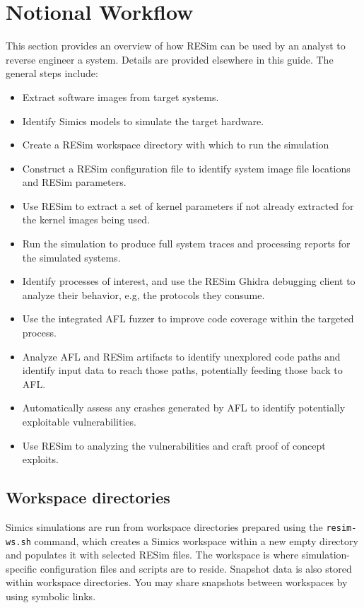 \documentclass[titlepage]{article}
\begin{document}
\section{Notional Workflow}
\label{workflow}
This section provides an overview of how RESim can be used by an analyst to reverse engineer a system. Details are provided elsewhere
in this guide.  The general steps include:
\begin{itemize}
\item Extract software images from target systems.
\item Identify Simics models to simulate the target hardware.
\item Create a RESim workspace directory with which to run the simulation
\item Construct a RESim configuration file to identify system image file locations and RESim parameters.
\item Use RESim to extract a set of kernel parameters if not already extracted for the kernel images being used.
\item Run the simulation to produce full system traces and processing reports for the simulated systems.
\item Identify processes of interest, and use the RESim Ghidra debugging client to analyze their behavior, e.g, the protocols they consume.
\item Use the integrated AFL fuzzer to improve code coverage within the targeted process.
\item Analyze AFL and RESim artifacts to identify unexplored code paths and identify input data to reach those paths, potentially feeding those back to AFL.
\item Automatically assess any crashes generated by AFL to identify potentially exploitable vulnerabilities.
\item Use RESim to analyzing the vulnerabilities and craft proof of concept exploits.
\end{itemize}

\subsection{Workspace directories}
Simics simulations are run from workspace directories prepared using the {\tt resim-ws.sh} command, which creates a Simics workspace within a new empty
directory and populates it with selected RESim files.  The workspace is where simulation-specific configuration files and scripts are to reside.  Snapshot
data is also stored within workspace directories.  You may share snapshots between workspaces by using symbolic links.  
\end{document}
